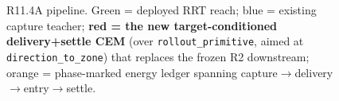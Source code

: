 \documentclass[11pt]{article}
\newcommand{\code}[1]{\texttt{\small #1}}
\begin{document}
\begin{figure}[h]\centering\caption{R11.4A pipeline. Green = deployed RRT reach; blue = existing capture
teacher; \textbf{red = the new target-conditioned delivery+settle CEM} (over \code{rollout\_primitive}, aimed at
\code{direction\_to\_zone}) that replaces the frozen R2 downstream; orange = phase-marked energy ledger spanning
capture$\to$delivery$\to$entry$\to$settle.}\end{figure}
\end{document}
